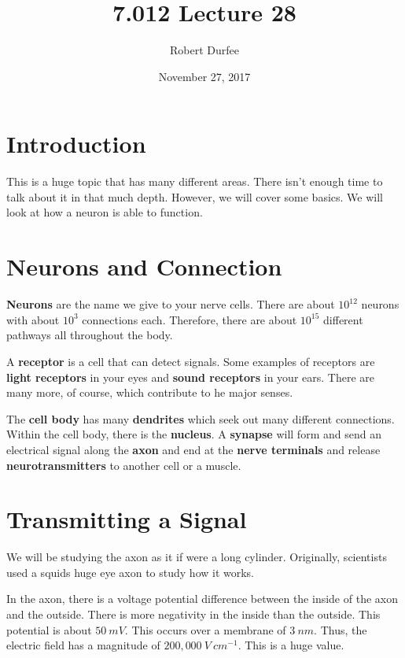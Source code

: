 \documentclass{article}
\title{ 7.012 Lecture 28 }
\author{ Robert Durfee }
\date{ November 27, 2017 }
\begin{document}
\maketitle

\section{ Introduction }

This is a huge topic that has many different areas. There isn't enough time to
talk about it in that much depth. However, we will cover some basics. We will
look at how a neuron is able to function.

\section{ Neurons and Connection }

\textbf{Neurons} are the name we give to your nerve cells. There are about
$10^{12}$ neurons with about $10^{3}$ connections each. Therefore, there are
about $10^{15}$ different pathways all throughout the body.

A \textbf{receptor} is a cell that can detect signals. Some examples of
receptors are \textbf{light receptors} in your eyes and \textbf{sound receptors}
in your ears. There are many more, of course, which contribute to he major
senses. 

The \textbf{cell body} has many \textbf{dendrites} which seek out many different
connections. Within the cell body, there is the \textbf{nucleus}. A
\textbf{synapse} will form and send an electrical signal along the \textbf{axon}
and end at the \textbf{nerve terminals} and release \textbf{neurotransmitters}
to another cell or a muscle.

\section{ Transmitting a Signal }

We will be studying the axon as it if were a long cylinder. Originally,
scientists used a squids huge eye axon to study how it works.

In the axon, there is a voltage potential difference between the inside of the
axon and the outside. There is more negativity in the inside than the outside.
This potential is about $50\ \si{ mV }$. This occurs over a membrane of $3\ \si{
nm}$. Thus, the electric field has a magnitude of $200,000\ \si{ V\ cm^{-1} }$.
This is a huge value.
\end{document}
